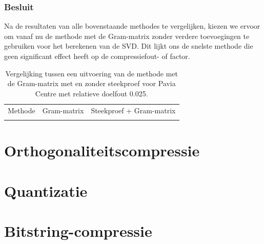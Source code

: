 \subsubsection{Besluit}

Na de resultaten van alle bovenstaande methodes te vergelijken, kiezen we ervoor om vanaf nu de methode met de Gram-matrix zonder verdere toevoegingen te gebruiken voor het berekenen van de SVD. Dit lijkt ons de snelste methode die geen significant effect heeft op de compressiefout- of factor.

\begin{table}[H]
\centering
\begin{tabular}{|l|l|l|}
\hline
Methode & Gram-matrix & Steekproef + Gram-matrix\\ \hhline{|=|=|=|}

\end{tabular}
\caption{Vergelijking tussen een uitvoering van de methode met de Gram-matrix met en zonder steekproef voor Pavia Centre met relatieve doelfout 0.025.}
\label{table:randomized-svd-pavia-test}
\end{table}

\section{Orthogonaliteitscompressie}

\section{Quantizatie}

\section{Bitstring-compressie}